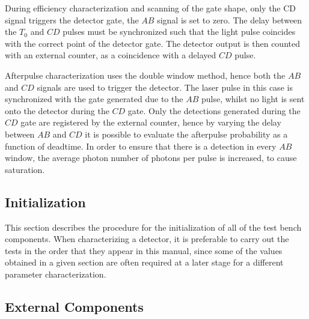\documentclass{article}
\begin{document}
During efficiency characterization and scanning of the gate shape, only the CD signal triggers the detector gate, the $AB$ signal is set to zero. The delay between the $T_0$ and $CD$ pulses must be synchronized such that the light pulse coincides with the correct point of the detector gate. The detector output is then counted with an external counter, as a coincidence with a delayed $CD$ pulse. 

Afterpulse characterization uses the double window method, hence both the $AB$ and $CD$ signals are used to trigger the detector. The laser pulse in this case is synchronized with the gate generated due to the $AB$ pulse, whilst no light is sent onto the detector during the $CD$ gate. Only the detections generated during the $CD$ gate are registered by the external counter, hence by varying the delay between $AB$ and $CD$ it is possible to evaluate the afterpulse probability as a function of deadtime. In order to ensure that there is a detection in every $AB$ window, the average photon number of photons per pulse is increased, to cause saturation.  

\subsection{Initialization}
This section describes the procedure for the initialization of all of the test bench components. When characterizing a detector, it is preferable to carry out the tests in the order that they appear in this manual, since some of the values obtained in a given section are often required at a later stage for a different parameter characterization.


\subsection{External Components}
\end{document}
